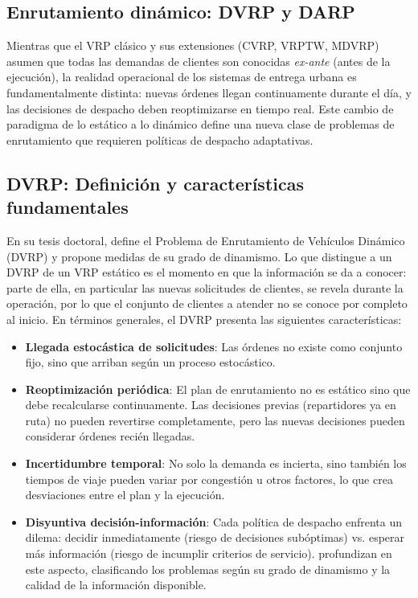 \documentclass[12pt,letterpaper,oneside]{book}
\begin{document}
\subsection{Enrutamiento dinámico: DVRP y DARP} %

Mientras que el VRP clásico y sus extensiones (CVRP, VRPTW, MDVRP) asumen que todas las demandas de clientes 
son conocidas \textit{ex-ante} (antes de la ejecución), la realidad operacional de los sistemas de entrega 
urbana es fundamentalmente distinta: nuevas órdenes llegan continuamente durante el día, y las decisiones de 
despacho deben reoptimizarse en tiempo real. Este cambio de paradigma de lo estático a lo dinámico
define una nueva clase de problemas de enrutamiento que requieren políticas de despacho adaptativas.

\subsection{DVRP: Definición y características fundamentales}

En su tesis doctoral, \citet{Larsen2000DVRP} define el Problema de Enrutamiento de Vehículos Dinámico (DVRP)
y propone medidas de su grado de dinamismo. Lo que distingue a un DVRP de un VRP estático es el momento
en que la información se da a conocer: parte de ella, en particular las nuevas solicitudes de clientes, se
revela durante la operación, por lo que el conjunto de clientes a atender no se conoce por completo al inicio.
En términos generales, el DVRP presenta las siguientes características:

\begin{itemize}
	\item \textbf{Llegada estocástica de solicitudes}: Las órdenes no existe como conjunto fijo, sino que 
	arriban según un proceso estocástico.
	
	\item \textbf{Reoptimización periódica}: El plan de enrutamiento no es estático sino que debe recalcularse 
	continuamente. Las decisiones previas (repartidores ya en ruta) no pueden revertirse completamente, pero 
	las nuevas decisiones pueden considerar órdenes recién llegadas.
	
	\item \textbf{Incertidumbre temporal}: No solo la demanda es incierta, sino también los tiempos de 
	viaje pueden variar por congestión u otros factores, lo que crea desviaciones entre el plan y la ejecución.
	
	\item \textbf{Disyuntiva decisión-información}: Cada política de despacho enfrenta un dilema: decidir 
	inmediatamente (riesgo de decisiones subóptimas) vs. esperar más información (riesgo de incumplir criterios de servicio). 
	\citet{Pillac2013} profundizan en este aspecto, clasificando los problemas según su grado de dinamismo y la calidad de la información disponible.
\end{itemize}
\end{document}
